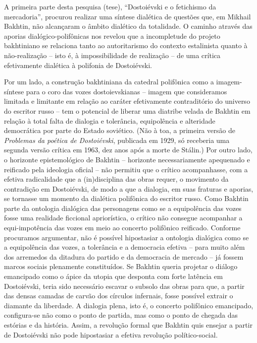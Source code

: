 A primeira parte desta pesquisa (tese), ``Dostoiévski e o fetichismo da
mercadoria'', procurou realizar uma síntese dialética de questões que,
em Mikhail Bakhtin, não alcançaram o âmbito dialético da totalidade. O
caminho através das aporias dialógico-polifônicas nos revelou que a
incompletude do projeto bakhtiniano se relaciona tanto ao autoritarismo
do contexto estalinista quanto à não-realização -- isto é, à
impossibilidade de realização -- de uma crítica efetivamente dialética à
polifonia de Dostoiévski.

Por um lado, a construção bakhtiniana da catedral polifônica como a
imagem-síntese para o coro das vozes dostoievskianas -- imagem que
consideramos limitada e limitante em relação ao caráter efetivamente
contraditório do universo do escritor russo -- tem o potencial de
liberar uma diatribe velada de Bakhtin em relação à total falta de
dialogia e tolerância, equipolência e alteridade democrática por parte
do Estado soviético. (Não à toa, a primeira versão de \emph{Problemas da
poética de Dostoiévski}, publicada em 1929, só receberia uma segunda
versão crítica em 1963, dez anos após a morte de Stálin.) Por outro
lado, o horizonte epistemológico de Bakhtin -- horizonte necessariamente
apequenado e reificado pela ideologia oficial -- não permitiu que o
crítico acompanhasse, com a efetiva radicalidade que a (in)disciplina
das obras requer, o movimento da contradição em Dostoiévski, de modo a
que a dialogia, em suas fraturas e aporias, se tornasse um momento da
dialética polifônica do escritor russo. Como Bakhtin parte da ontologia
dialógica das personagens como se a equipolência das vozes fosse uma
realidade ficcional apriorística, o crítico não consegue acompanhar a
equi-impotência das vozes em meio ao concerto polifônico reificado.
Conforme procuramos argumentar, não é possível hipostasiar a ontologia
dialógica como se a equipolência das vozes, a tolerância e a democracia
efetiva -- para muito além dos arremedos da ditadura do partido e da
democracia de mercado -- já fossem marcos sociais plenamente
constituídos. Se Bakhtin queria projetar o diálogo emancipado como o
ápice da utopia que desponta com forte latência em Dostoiévski, teria
sido necessário escavar o subsolo das obras para que, a partir das
densas camadas de carvão dos círculos infernais, fosse possível extrair
o diamante da liberdade. A dialogia plena, isto é, o concerto polifônico
emancipado, configura-se não como o ponto de partida, mas como o ponto
de chegada das estórias e da história. Assim, a revolução formal que
Bakhtin quis ensejar a partir de Dostoiévski não pode hipostasiar a
efetiva revolução político-social.

